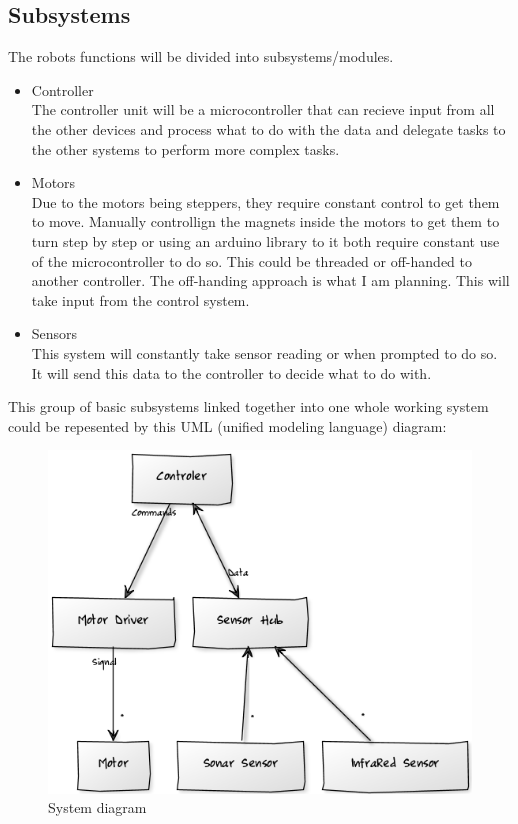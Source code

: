 \documentclass[11pt,fleqn,twoside]{article}
\begin{document}
\subsection{Subsystems}
The robots functions will be divided into subsystems/modules.
\begin{itemize}
\item Controller
\\The controller unit will be a microcontroller that can recieve input from all the other devices and process what to do with the data and delegate tasks to the other systems to perform more complex tasks.
\item Motors
\\Due to the motors being steppers, they require constant control to get them to move.  Manually controllign the magnets inside the motors to get them to turn step by step or using an arduino library to it both require constant use of the microcontroller to do so.  This could be threaded or off-handed to another controller.  The off-handing approach is what I am planning.  This will take input from the control system.
\item Sensors
\\This system will constantly take sensor reading or when prompted to do so.  It will send this data to the controller to decide what to do with.
\end{itemize}
This group of basic subsystems linked together into one whole working system could be repesented by this UML (unified modeling language) diagram:
\begin{figure}[h]
\centering
	\includegraphics[width=5.0in] {figures/simple-uml.png}
	\caption{System diagram}
	\label{System diagram}
\end{figure}
\end{document}
